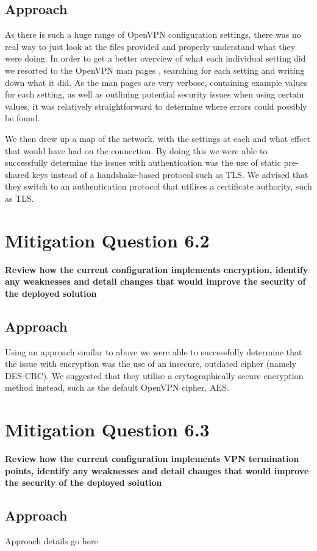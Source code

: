 \subsection{Approach}
As there is such a huge range of OpenVPN configuration settings, there was no
real way to just look at the files provided and properly understand what they
were doing. In order to get a better overview of what each individual setting
did we resorted to the OpenVPN man pages \cite{OpenVPNMan}, searching for each
setting and writing down what it did. As the man pages are very verbose,
containing example values for each setting, as well as outlining potential
security issues when using certain values, it was relatively straightforward to
determine where errors could possibly be found.

We then drew up a map of the network, with the settings at each and what effect
that would have had on the connection. By doing this we were able to
successfully determine the issues with authentication was the use of static
pre-shared keys instead of a handshake-based protocol such as TLS. We advised
that they switch to an authentication protocol that utilises a certificate
authority, such as TLS.

\section{Mitigation Question 6.2}
\textbf{Review how the current configuration implements encryption, identify any
weaknesses and detail changes that would improve the security of the deployed
solution}
\subsection{Approach}
Using an approach similar to above we were able to successfully determine that
the issue with encryption was the use of an insecure, outdated cipher (namely
DES-CBC). We suggested that they utilise a crytographically secure encryption
method instead, such as the default OpenVPN cipher, AES.

\section{Mitigation Question 6.3}
\textbf{Review how the current configuration implements VPN termination points,
identify any weaknesses and detail changes that would improve the security of
the deployed solution}
\subsection{Approach}
Approach details go here

